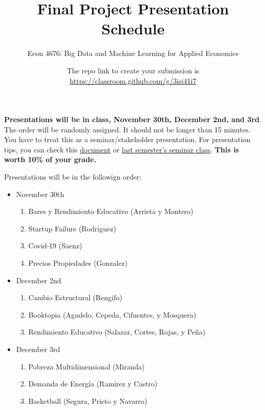 \documentclass[12pt,onecolumn]{article}
\title{Final Project Presentation Schedule}
\subtitle{Econ 4676: Big Data and Machine Learning for Applied Economics}
\author{}
\date{The repo link to create your submission is \url{https://classroom.github.com/g/3isi41i7}}
\begin{document}
\maketitle


{\bf Presentations will be in class, November 30th, December 2nd, and 3rd}. The order will be randomly assigned. It should not be longer than 15 minutes. You have to treat this as a seminar/stakeholder presentation. For presentation tips, you can check this \href{https://ignaciomsarmiento.github.io/teaching/seminar/Tips_Presentation_PEG.pdf}{document} or  \href{https://ignaciomsarmiento.github.io/teaching/Tesis.html}{last semester's seminar class}. {\bf This is worth 10\% of your grade.}

Presentations will be in the followign order:

\begin{itemize}
  \item November 30th
  \begin{enumerate}
      \item Bares y Rendimiento Educativo (Arrieta y Montero)
      \item Startup Failure (Rodriguez)
      \item Covid-19 (Saenz)
      \item Precios Propiedades (Gonzalez)
    \end{enumerate}
    \item December 2nd
    \begin{enumerate}
      \item Cambio Estructural (Rengifo)
      \item Booktopia (Agudelo, Cepeda, Cifuentes, y Mosquera)
      \item Rendimiento Educativo (Salazar, Cortes, Rojas, y Peña)
      \end{enumerate}
      \item December 3rd
      \begin{enumerate}
        \item Pobreza Multidimensional (Miranda)
        \item Demanda de Energía (Ramírez y Castro)
        \item Basketball (Segura, Prieto y Navarro)
      \end{enumerate}
\end{itemize}

 
\end{document}

